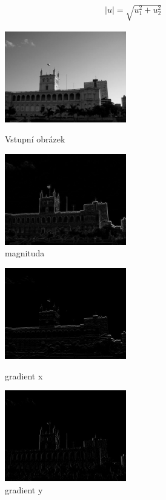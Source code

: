 \documentclass{report}
\begin{document}
\begin{align}
   \label{velikost_vektoru} |u| = \sqrt{u_1^2 + u_2^2}
\end{align}

\begin{figure}[htp]
	\centering
	\begin{minipage}[c]{150pt}
		\centering
		\includegraphics[width=150pt]{./img/vstupni_obraz.jpg}
		\caption{Vstupní obrázek}
	\end{minipage}
	\begin{minipage}[c]{150pt}
		\includegraphics[width=150pt]{./img/magnitude.png}
		\caption{magnituda}
		\centering
	\end{minipage}
\end{figure}

\begin{figure}[htp]
	\centering
	\begin{minipage}[c]{150pt}
		\centering
		\includegraphics[width=150pt]{./img/gradientX.png}
		\caption{gradient x}
	\end{minipage}
	\begin{minipage}[c]{150pt}
		\includegraphics[width=150pt]{./img/gradientY.png}
		\caption{gradient y}
		\centering
	\end{minipage}
\end{figure}
\end{document}

